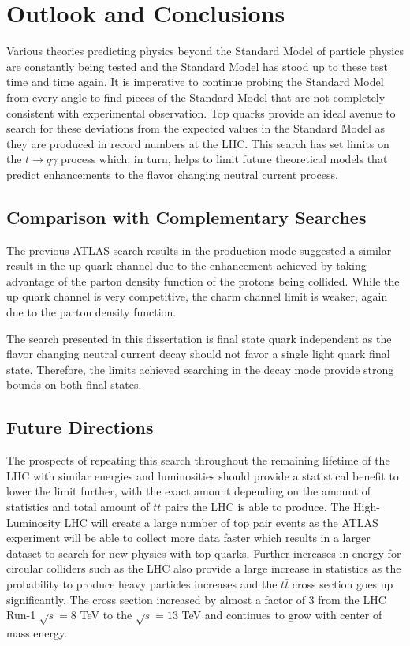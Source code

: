 
\chapter{Outlook and Conclusions}
\label{ch:Conclusion}
Various theories predicting physics beyond the Standard Model of particle physics are constantly being tested and the Standard Model has stood up to these test time and time again.  It is imperative to continue probing the Standard Model from every angle to find pieces of the Standard Model that are not completely consistent with experimental observation.  Top quarks provide an ideal avenue to search for these deviations from the expected values in the Standard Model as they are produced in record numbers at the LHC.  This search has set limits on the $t\rightarrow q \gamma$ process which, in turn, helps to limit future theoretical models that predict enhancements to the flavor changing neutral current process.

\section{Comparison with Complementary Searches}

The previous ATLAS search results in the production mode\cite{GregorFCNC} suggested a similar result in the up quark channel due to the enhancement achieved by taking advantage of the parton density function of the protons being collided.  While the up quark channel is very competitive, the charm channel limit is weaker, again due to the parton density function.  

The search presented in this dissertation is final state quark independent as the flavor changing neutral current decay should not favor a single light quark final state.  Therefore, the limits achieved searching in the decay mode provide strong bounds on both final states. 

\section{Future Directions}
The prospects of repeating this search throughout the remaining lifetime of the LHC with similar energies and luminosities should provide a statistical benefit to lower the limit further, with the exact amount depending on the amount of statistics and total amount of $t\bar{t}$ pairs the LHC is able to produce.  The High-Luminosity LHC will create a large number of top pair events as the ATLAS experiment will be able to collect more data faster which results in a larger dataset to search for new physics with top quarks.  Further increases in energy for circular colliders such as the LHC also provide a large increase in statistics as the probability to produce heavy particles increases and the $t\bar{t}$ cross section goes up significantly.  The cross section increased by almost a factor of 3 from the LHC Run-1 $\sqrt{s}=8$ TeV to the $\sqrt{s}=13$ TeV and continues to grow with center of mass energy.

